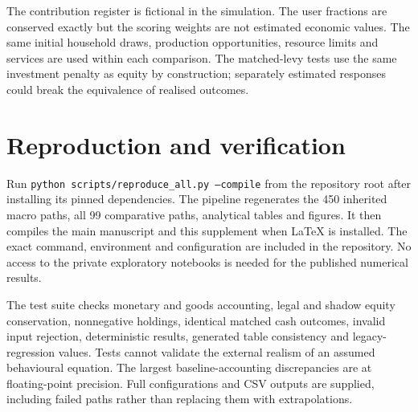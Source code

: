 \documentclass[11pt,a4paper]{article}
\begin{document}
The contribution register is fictional in the simulation. The user fractions are conserved exactly but the scoring weights are not estimated economic values. The same initial household draws, production opportunities, resource limits and services are used within each comparison. The matched-levy tests use the same investment penalty as equity by construction; separately estimated responses could break the equivalence of realised outcomes.

\section{Reproduction and verification}
Run \texttt{python scripts/reproduce\_all.py --compile} from the repository root after installing its pinned dependencies. The pipeline regenerates the 450 inherited macro paths, all 99 comparative paths, analytical tables and figures. It then compiles the main manuscript and this supplement when LaTeX is installed. The exact command, environment and configuration are included in the repository. No access to the private exploratory notebooks is needed for the published numerical results.

The test suite checks monetary and goods accounting, legal and shadow equity conservation, nonnegative holdings, identical matched cash outcomes, invalid input rejection, deterministic results, generated table consistency and legacy-regression values. Tests cannot validate the external realism of an assumed behavioural equation. The largest baseline-accounting discrepancies are at floating-point precision. Full configurations and CSV outputs are supplied, including failed paths rather than replacing them with extrapolations.


\end{document}
